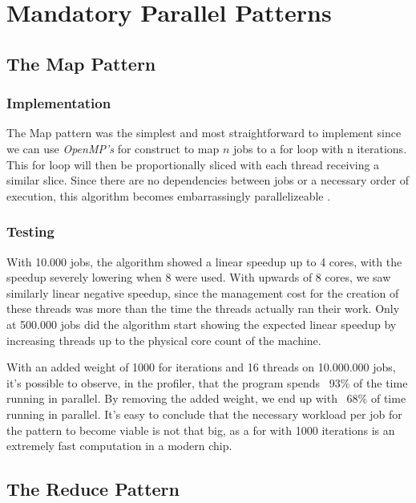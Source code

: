 \documentclass[10pt,journal]{IEEEtran}
\begin{document}
\section{Mandatory Parallel Patterns}

\subsection{The Map Pattern}
\label{map}

\subsubsection{Implementation}

The Map pattern was the simplest and most straightforward to implement since we can use \textit{OpenMP's} for construct to map $ n $ jobs to a for loop with n iterations. This for loop will then be proportionally sliced with each thread receiving a similar slice. Since there are no dependencies between jobs or a necessary order of execution, this algorithm becomes embarrassingly parallelizeable \cite{mccool}.

\subsubsection{Testing}

With 10.000 jobs, the algorithm showed a linear speedup up to 4 cores, with the speedup severely lowering when 8 were used. With upwards of 8 cores, we saw similarly linear negative speedup, since the management cost for the creation of these threads was more than the time the threads actually ran their work. Only at 500.000 jobs did the algorithm start showing the expected linear speedup by increasing threads up to the physical core count of the machine.

With an added weight of 1000 for iterations and 16 threads on 10.000.000 jobs, it's possible to observe, in the profiler, that the program spends ~93\% of the time running in parallel. By removing the added weight, we end up with ~68\% of time running in parallel. It's easy to conclude that the necessary workload per job for the pattern to become viable is not that big, as a for with 1000 iterations is an extremely fast computation in a modern chip.

\subsection{The Reduce Pattern}
\label{reduce}
\end{document}
